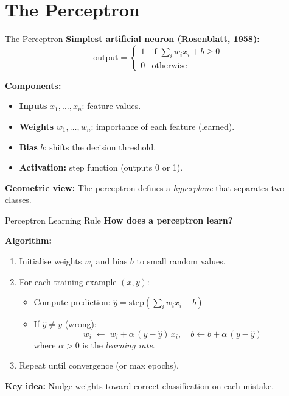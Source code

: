 \documentclass[10pt]{beamer}
\begin{document}
\section{The Perceptron}

\begin{frame}{The Perceptron}
    \textbf{Simplest artificial neuron (Rosenblatt, 1958):}
    \[
        \text{output} = \begin{cases}
            1 & \text{if } \displaystyle\sum_i w_i x_i + b \geq 0 \\
            0 & \text{otherwise}
        \end{cases}
    \]

    \vspace{0.2cm}
    \textbf{Components:}
    \begin{itemize}
        \item \textbf{Inputs} $x_1, \ldots, x_n$: feature values.
        \item \textbf{Weights} $w_1, \ldots, w_n$: importance of each feature (learned).
        \item \textbf{Bias} $b$: shifts the decision threshold.
        \item \textbf{Activation:} step function (outputs 0 or 1).
    \end{itemize}

    \vspace{0.2cm}
    \textbf{Geometric view:} The perceptron defines a \emph{hyperplane} that separates two classes.
\end{frame}

\begin{frame}{Perceptron Learning Rule}
    \textbf{How does a perceptron learn?}

    \vspace{0.2cm}
    \textbf{Algorithm:}
    \begin{enumerate}
        \item Initialise weights $w_i$ and bias $b$ to small random values.
        \item For each training example $(x, y)$:
        \begin{itemize}
            \item Compute prediction: $\hat{y} = \text{step}\!\left(\sum_i w_i x_i + b\right)$
            \item If $\hat{y} \neq y$ (wrong):
            \[
                w_i \;\gets\; w_i + \alpha\,(y - \hat{y})\,x_i, \quad b \gets b + \alpha\,(y-\hat{y})
            \]
            where $\alpha > 0$ is the \emph{learning rate}.
        \end{itemize}
        \item Repeat until convergence (or max epochs).
    \end{enumerate}

    \vspace{0.2cm}
    \textbf{Key idea:} Nudge weights toward correct classification on each mistake.
\end{frame}
\end{document}
